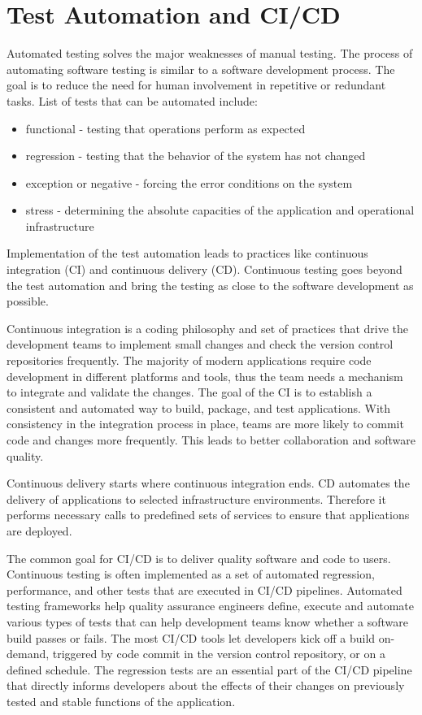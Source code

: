 \section{Test Automation and CI/CD}
Automated testing solves the major weaknesses of manual testing. The process of automating software testing is similar to a software development process. The goal is to reduce the need for human involvement in repetitive or redundant tasks. List of tests that can be automated include\cite{ci_tests}:
\begin{itemize}
    \item functional - testing that operations perform as expected
    \item regression - testing that the behavior of the system has not changed
    \item exception or negative - forcing the error conditions on the system
    \item stress - determining the absolute capacities of the application and operational infrastructure
\end{itemize}

Implementation of the test automation leads to practices like continuous integration (CI) and continuous delivery (CD). Continuous testing goes beyond the test automation and bring the testing as close to the software development as possible.

Continuous integration is a coding philosophy and set of practices that drive the development teams to implement small changes and check the version control repositories frequently. The majority of modern applications require code development in different platforms and tools, thus the team needs a mechanism to integrate and validate the changes. The goal of the CI is to establish a consistent and automated way to build, package, and test applications. With consistency in the integration process in place, teams are more likely to commit code and changes more frequently. This leads to better collaboration and software quality.

Continuous delivery starts where continuous integration ends. CD automates the delivery of applications to selected infrastructure environments. Therefore it performs necessary calls to predefined sets of services to ensure that applications are deployed.

The common goal for CI/CD is to deliver quality software and code to users. Continuous testing is often implemented as a set of automated regression, performance, and other tests that are executed in CI/CD pipelines. Automated testing frameworks help quality assurance engineers define, execute and automate various types of tests that can help development teams know whether a software build passes or fails. The most CI/CD tools let developers kick off a build on-demand, triggered by code commit in the version control repository, or on a defined schedule. The regression tests are an essential part of the CI/CD pipeline that directly informs developers about the effects of their changes on previously tested and stable functions of the application.\cite{CI}  


